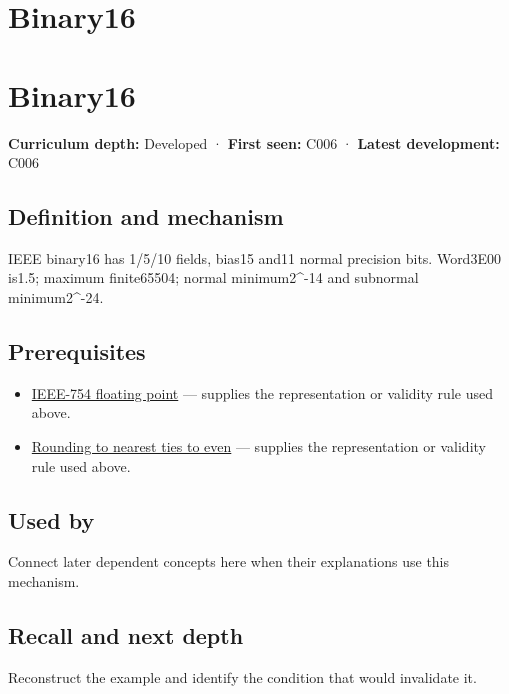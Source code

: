 \hypertarget{appendix-34443cec7170}{}
\section*{Binary16}
\section{Binary16}\label{appendix-34443cec7170-binary16}

\textbf{Curriculum depth:} Developed · \textbf{First seen:} C006 · \textbf{Latest development:} C006

\subsection{Definition and mechanism}\label{appendix-34443cec7170-definition-and-mechanism}

IEEE binary16 has 1/5/10 fields, bias15 and11 normal precision bits. Word3E00 is1.5; maximum finite65504; normal minimum2\^{}-14 and subnormal minimum2\^{}-24.

\subsection{Prerequisites}\label{appendix-34443cec7170-prerequisites}

\begin{itemize}
\tightlist
\item
  \hyperref[appendix-343615f49ddf]{IEEE-754 floating point} --- supplies the representation or validity rule used above.
\item
  \hyperref[appendix-614afe1de592]{Rounding to nearest ties to even} --- supplies the representation or validity rule used above.
\end{itemize}

\subsection{Used by}\label{appendix-34443cec7170-used-by}

Connect later dependent concepts here when their explanations use this mechanism.

\subsection{Recall and next depth}\label{appendix-34443cec7170-recall-and-next-depth}

Reconstruct the example and identify the condition that would invalidate it.

